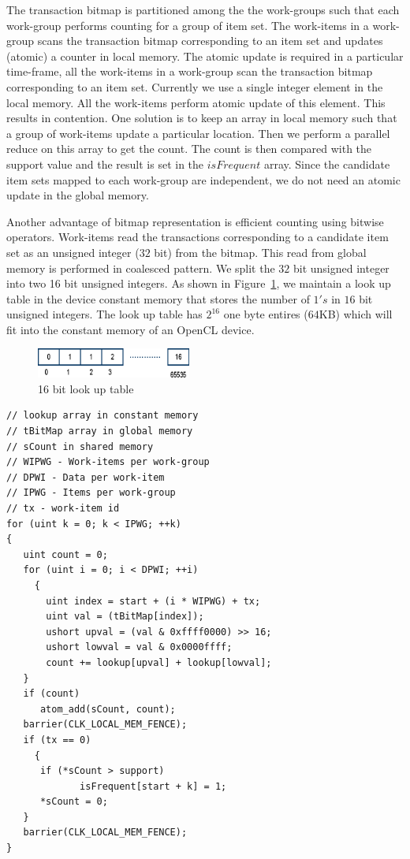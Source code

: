 \documentclass[conference]{IEEEtran}
\begin{document}
The transaction bitmap is partitioned among the the work-groups such that each work-group performs counting for a group of item set. The work-items in a work-group scans the transaction bitmap corresponding to an item set and updates (atomic) a counter in local memory. The atomic update is required in a particular time-frame, all the work-items in a work-group scan the transaction bitmap corresponding to an item set. Currently we use a single integer element in the local memory. All the work-items perform atomic update of this element. This results in contention. One solution is to keep an array in local memory such that a group of work-items update a particular location. Then we perform a parallel reduce on this array to get the count. The count is then compared with the support value and the result is set in the $isFrequent$ array. Since the candidate item sets mapped to each work-group are independent, we do not need an atomic update in the global memory.

Another advantage of bitmap representation is efficient counting using bitwise operators. Work-items read the transactions corresponding to a candidate item set as an unsigned integer ($32$ bit) from the bitmap. This read from global memory is performed in coalesced pattern. We split the $32$ bit unsigned integer into two 16 bit unsigned integers. As shown in Figure~\ref{fig:lookup}, we maintain a look up table in the device constant memory that stores the number of $1's$ in $16$ bit unsigned integers. The look up table has $2^{16}$ one byte entires ($64$KB) which will fit into the constant memory of an OpenCL device.

\begin{figure}[!t]
\centering
\includegraphics[width=2in]{lookuptable.eps}
\caption{16 bit look up table}
\label{fig:lookup}
\end{figure}


\begin{lstlisting}[caption={OpenCL Kernel for counting frequent item sets}, label=list:counting]
// lookup array in constant memory
// tBitMap array in global memory
// sCount in shared memory
// WIPWG - Work-items per work-group
// DPWI - Data per work-item
// IPWG - Items per work-group
// tx - work-item id
for (uint k = 0; k < IPWG; ++k) 
{
   uint count = 0;
   for (uint i = 0; i < DPWI; ++i) 
	 {	
       uint index = start + (i * WIPWG) + tx;
       uint val = (tBitMap[index]);
       ushort upval = (val & 0xffff0000) >> 16;
       ushort lowval = val & 0x0000ffff;
       count += lookup[upval] + lookup[lowval];
   }
   if (count)
      atom_add(sCount, count);
   barrier(CLK_LOCAL_MEM_FENCE);
   if (tx == 0) 
	 {	
      if (*sCount > support) 
		     isFrequent[start + k] = 1;
      *sCount = 0; 
   }
   barrier(CLK_LOCAL_MEM_FENCE);
}
\end{lstlisting}
\end{document}
